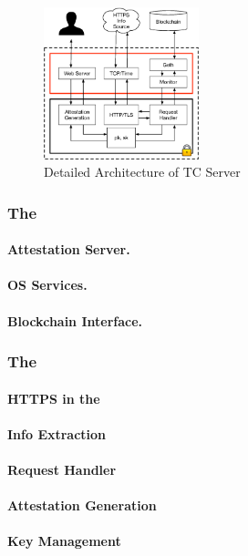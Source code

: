 \begin{figure}[h]
    \centering
    \includegraphics[width=0.4\textwidth]{figures/impl}
    \caption{Detailed Architecture of TC Server}
    \label{fig:tcserver_impl}
\end{figure}

\subsubsection{The \medname}

\paragraph{Attestation Server.} 

\paragraph{OS Services.}

\paragraph{Blockchain Interface.}

\subsubsection{The \encname}

\paragraph{HTTPS in the \encname}
\paragraph{Info Extraction}
\paragraph{Request Handler}
\paragraph{Attestation Generation}
\paragraph{Key Management}
